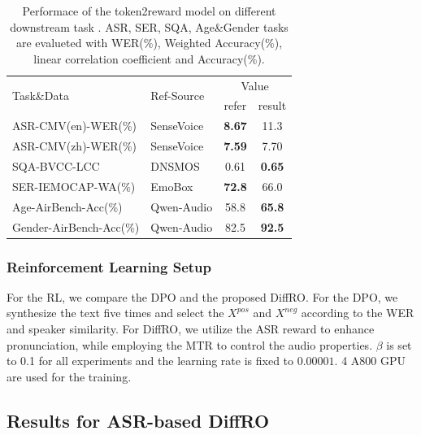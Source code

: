 \documentclass[a4paper]{article}
\begin{document}
\begin{table}[!t]
    \centering
    \begin{tabular}{ll cc}
    \hline
       \multirow{2}{*}{Task\&Data} &\multirow{2}{*}{Ref-Source}  & \multicolumn{2}{c}{Value}  \\
        & & refer & result  \\
    \hline
         ASR-CMV(en)-WER(\%) &  SenseVoice  &  \textbf{8.67} &  11.3  \\
           ASR-CMV(zh)-WER(\%) &  SenseVoice  &  \textbf{7.59} &  7.70  \\
         \hline
           SQA-BVCC-LCC &  DNSMOS &  0.61 &  \textbf{0.65}  \\
          SER-IEMOCAP-WA(\%) &  EmoBox       &  \textbf{72.8} &  66.0  \\
          Age-AirBench-Acc(\%) &  Qwen-Audio &  58.8 &  \textbf{65.8}  \\
          Gender-AirBench-Acc(\%) &  Qwen-Audio &  82.5 &  \textbf{92.5}  \\

    \hline
    \end{tabular}
    \caption{Performace of the token2reward model on different downstream task . ASR, SER, SQA, Age\&Gender tasks are evalueted with WER(\%), Weighted Accuracy(\%), linear correlation coefficient and Accuracy(\%).}
    \label{tab:mtr_reward}
\end{table}


\subsubsection{Reinforcement Learning Setup}
For the RL, we compare the DPO and the proposed DiffRO. For the DPO, we synthesize the text five times and select the $X^{pos}$ and $X^{neg}$ according to the WER and speaker similarity. 
For DiffRO, we utilize the ASR reward to enhance pronunciation, while employing the MTR to control the audio properties. $\beta$ is set to 0.1 for all experiments and the learning rate is fixed to $0.00001$. 4 A800 GPU are used for the training. 


\subsection{Results for ASR-based DiffRO}
\end{document}
